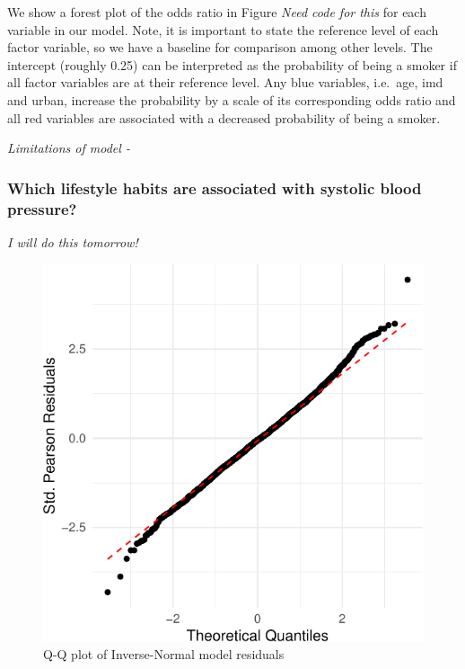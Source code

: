 \documentclass[
  11pt,
]{article}
\begin{document}
We show a forest plot of the odds ratio in Figure \emph{Need code for
this} for each variable in our model. Note, it is important to state the
reference level of each factor variable, so we have a baseline for
comparison among other levels. The intercept (roughly 0.25) can be
interpreted as the probability of being a smoker if all factor variables
are at their reference level. Any blue variables, i.e.~age, imd and
urban, increase the probability by a scale of its corresponding odds
ratio and all red variables are associated with a decreased probability
of being a smoker.

\emph{Limitations of model -}

\subsubsection{Which lifestyle habits are associated with systolic blood
pressure?}\label{which-lifestyle-habits-are-associated-with-systolic-blood-pressure}

\emph{I will do this tomorrow!}

\begin{figure}[H]

{\centering \includegraphics{Coursework_files/figure-latex/output qq plot for q3-1} 

}

\caption{Q-Q plot of Inverse-Normal model residuals}\label{fig:output qq plot for q3}
\end{figure}
\end{document}
